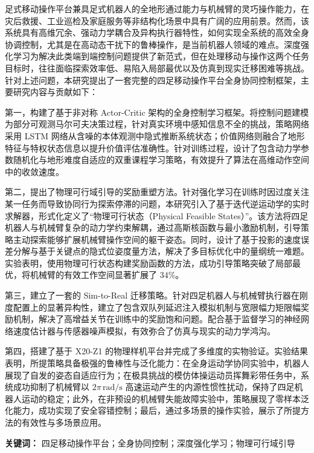 \cleardoublepage
{}
足式移动操作平台兼具足式机器人的全地形通过能力与机械臂的灵巧操作能力，在灾后救援、工业巡检及家庭服务等非结构化场景中具有广阔的应用前景。然而，该系统具有高维冗余、强动力学耦合及异构执行器特性，如何实现全系统的高效全身协调控制，尤其是在高动态干扰下的鲁棒操作，是当前机器人领域的难点。深度强化学习为解决此类端到端控制问题提供了新范式，但在处理移动与操作这两个任务目标时，往往面临探索效率低、易陷入局部最优以及仿真到现实迁移困难等挑战。针对上述问题，本研究提出了一套完整的四足移动操作平台全身协同控制框架，主要研究内容与贡献如下：

第一，构建了基于非对称 Actor-Critic 架构的全身控制学习框架。将控制问题建模为部分可观测马尔可夫决策过程，针对真实环境中感知信息不全的挑战，策略网络采用 LSTM 网络从含噪的本体观测中隐式推断系统状态；价值网络则融合了地形特征与特权状态信息以提升价值评估准确性。针对训练过程，设计了包含动力学参数随机化与地形难度自适应的双重课程学习策略，有效提升了算法在高维动作空间中的收敛速度。

第二，提出了物理可行域引导的奖励重塑方法。针对强化学习在训练时因过度关注某一任务而导致协同行为探索停滞的问题，本研究引入了基于迭代逆运动学的实时求解器，形式化定义了“物理可行状态（Physical Feasible States）”。该方法将四足机器人与机械臂复杂的动力学约束解耦，通过高斯核函数与最小激励机制，引导策略主动探索能够扩展机械臂操作空间的躯干姿态。同时，设计了基于投影的速度误差分解与基于关键点的隐式位姿度量方法，解决了多目标优化中的量纲统一难题。实验表明，使用物理可行状态构建奖励函数的方法，成功引导策略突破了局部最优，将机械臂的有效工作空间显著扩展了 $34\%$。

第三，建立了一套的 Sim-to-Real 迁移策略。针对四足机器人与机械臂执行器在刚度配置上的显著异构性，建立了包含双队列延迟注入模拟机制与宽限幅力矩限幅奖励机制，解决了高增益关节在训练中的奖励饱和问题。配合基于监督学习的神经网络速度估计器与传感器噪声模拟，有效弥合了仿真与现实的动力学鸿沟。

第四，搭建了基于 X20-Z1 的物理样机平台并完成了多维度的实物验证。实验结果表明，所提策略具备极强的鲁棒性与泛化能力：在全身运动学协同实验中，机器人展现了自发的姿态自适应行为；在极具挑战的模仿体操运动员挥舞彩带任务中，系统成功抑制了机械臂以 $2\pi\,\text{rad/s}$ 高速运动产生的内源性惯性扰动，保持了四足机器人运动的稳定；此外，在非预设的机械臂失能故障实验中，策略展现了零样本泛化能力，成功实现了安全容错控制；最后，通过多场景的操作实验，展示了所提方法的有效性与多场景应用。

\vspace{1em}
\noindent \textbf{关键词：} 四足移动操作平台；全身协同控制；深度强化学习；物理可行域引导

